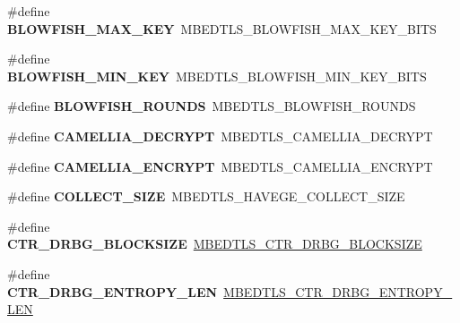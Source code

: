 \begin{DoxyCompactItemize}
\mbox{\label{compat-1_83_8h_a9b3eef52032f51fd010a59d1265e644c}} 
\#define {\bfseries B\+L\+O\+W\+F\+I\+S\+H\+\_\+\+M\+A\+X\+\_\+\+K\+EY}~M\+B\+E\+D\+T\+L\+S\+\_\+\+B\+L\+O\+W\+F\+I\+S\+H\+\_\+\+M\+A\+X\+\_\+\+K\+E\+Y\+\_\+\+B\+I\+TS
\item 
\mbox{\label{compat-1_83_8h_a751816537f868b47b91f4c1f448dc2ea}} 
\#define {\bfseries B\+L\+O\+W\+F\+I\+S\+H\+\_\+\+M\+I\+N\+\_\+\+K\+EY}~M\+B\+E\+D\+T\+L\+S\+\_\+\+B\+L\+O\+W\+F\+I\+S\+H\+\_\+\+M\+I\+N\+\_\+\+K\+E\+Y\+\_\+\+B\+I\+TS
\item 
\mbox{\label{compat-1_83_8h_a4dd158a68247e4a094f9bb607c62b131}} 
\#define {\bfseries B\+L\+O\+W\+F\+I\+S\+H\+\_\+\+R\+O\+U\+N\+DS}~M\+B\+E\+D\+T\+L\+S\+\_\+\+B\+L\+O\+W\+F\+I\+S\+H\+\_\+\+R\+O\+U\+N\+DS
\item 
\mbox{\label{compat-1_83_8h_a1f0130ae5c96dd542e1d1d9e87d7f529}} 
\#define {\bfseries C\+A\+M\+E\+L\+L\+I\+A\+\_\+\+D\+E\+C\+R\+Y\+PT}~M\+B\+E\+D\+T\+L\+S\+\_\+\+C\+A\+M\+E\+L\+L\+I\+A\+\_\+\+D\+E\+C\+R\+Y\+PT
\item 
\mbox{\label{compat-1_83_8h_aeac0ba1b8a0caa424d8c33b7d616a758}} 
\#define {\bfseries C\+A\+M\+E\+L\+L\+I\+A\+\_\+\+E\+N\+C\+R\+Y\+PT}~M\+B\+E\+D\+T\+L\+S\+\_\+\+C\+A\+M\+E\+L\+L\+I\+A\+\_\+\+E\+N\+C\+R\+Y\+PT
\item 
\mbox{\label{compat-1_83_8h_a3a37b97f6111e51ff65bd8bf3fd8677b}} 
\#define {\bfseries C\+O\+L\+L\+E\+C\+T\+\_\+\+S\+I\+ZE}~M\+B\+E\+D\+T\+L\+S\+\_\+\+H\+A\+V\+E\+G\+E\+\_\+\+C\+O\+L\+L\+E\+C\+T\+\_\+\+S\+I\+ZE
\item 
\mbox{\label{compat-1_83_8h_a907251d56e7adb3d795bfe04e1f36865}} 
\#define {\bfseries C\+T\+R\+\_\+\+D\+R\+B\+G\+\_\+\+B\+L\+O\+C\+K\+S\+I\+ZE}~\mbox{\hyperlink{ctr__drbg_8h_a73f77e540752ebec67e2477f776ed8a9}{M\+B\+E\+D\+T\+L\+S\+\_\+\+C\+T\+R\+\_\+\+D\+R\+B\+G\+\_\+\+B\+L\+O\+C\+K\+S\+I\+ZE}}
\item 
\mbox{\label{compat-1_83_8h_aad464fda72b082db273843523b6de363}} 
\#define {\bfseries C\+T\+R\+\_\+\+D\+R\+B\+G\+\_\+\+E\+N\+T\+R\+O\+P\+Y\+\_\+\+L\+EN}~\mbox{\hyperlink{ctr__drbg_8h_ac71c76b50eb79055e11f86d0d796b979}{M\+B\+E\+D\+T\+L\+S\+\_\+\+C\+T\+R\+\_\+\+D\+R\+B\+G\+\_\+\+E\+N\+T\+R\+O\+P\+Y\+\_\+\+L\+EN}}

\end{DoxyCompactItemize}

